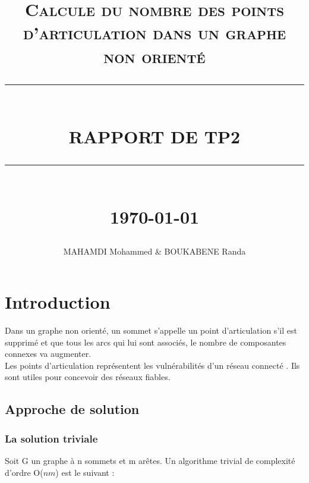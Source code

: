\documentclass[12pt]{report}
\newcommand{\HRule}[1]{\rule{\linewidth}{#1}}
\begin{document}
	\renewcommand{\contentsname}{Table des Matières}
\renewcommand{\listfigurename}{Table des Figures}

	\author{MAHAMDI Mohammed & BOUKABENE Randa }       
	\date{} 
	\title{  \textsc{ Calcule du nombre des points d'articulation dans un graphe non orienté }
		\\ [2.0cm]
		\HRule{0.5pt} \\
		\LARGE \textbf{\uppercase{Rapport de TP2 }}
		\HRule{2pt} \\ [0.5cm]
		\normalsize \today \vspace*{5\baselineskip}}
	\maketitle
	\tableofcontents
\newpage
\listoffigures 
	\newpage
	\sectionfont{\scshape}
	
	\chapter{Introduction}
	 
	Dans un graphe non orienté, un sommet s'appelle un point d'articulation s'il est supprimé et que tous les arcs qui lui sont associés, le nombre de composantes connexes va augmenter.\\
	 Les points d'articulation représentent les vulnérabilités d'un réseau connecté . Ils sont utiles pour concevoir des réseaux fiables.
	\section{Approche de solution}
	\subsection{La solution triviale}
Soit G un graphe à n sommets et m arêtes. Un algorithme trivial de complexité d'ordre O($nm$) est le suivant :
\end{document}
